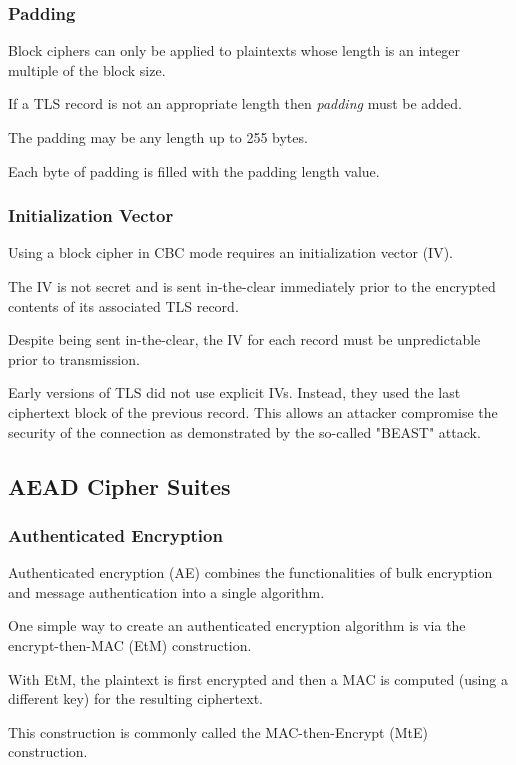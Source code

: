 \documentclass[aspectratio=169]{beamer}
\begin{document}
%	
%	

\begin{frame}
	\frametitle{Padding}
	Block ciphers can only be applied to plaintexts whose length is an integer multiple of the block size.
	
	\vfill
	
	If a TLS record is not an appropriate length then \emph{padding} must be added.

	\vfill
	
	The padding may be any length up to 255 bytes.
	
	\vfill
	
	Each byte of padding is filled with the padding length value.
\end{frame}

\begin{frame}
	\frametitle{Initialization Vector}
	Using a block cipher in CBC mode requires an initialization vector (IV).
	
	\vfill
	
	The IV is not secret and is sent in-the-clear immediately prior to the encrypted contents of its associated TLS record.
	
	\vfill
	
	Despite being sent in-the-clear, the IV for each record must be unpredictable prior to transmission.
	
	\vfill
	
	Early versions of TLS did not use explicit IVs. Instead, they used the last ciphertext block of the previous record. This allows an attacker compromise the security of the connection as demonstrated by  the so-called "BEAST" attack.

\end{frame}
\subsection{AEAD Cipher Suites}
\begin{frame}
	\frametitle{Authenticated Encryption}
	Authenticated encryption (AE) combines the functionalities of bulk encryption and message authentication into a single algorithm.
	
	\vfill
	
	One simple way to create an authenticated encryption algorithm is via the encrypt-then-MAC (EtM) construction.
	
	\vfill
	
	With EtM, the plaintext is first encrypted and then a MAC is computed (using a different key) for the resulting ciphertext. 
	
	\vfill
	
	This construction is commonly called the MAC-then-Encrypt (MtE) construction.
\end{frame}
\end{document}
